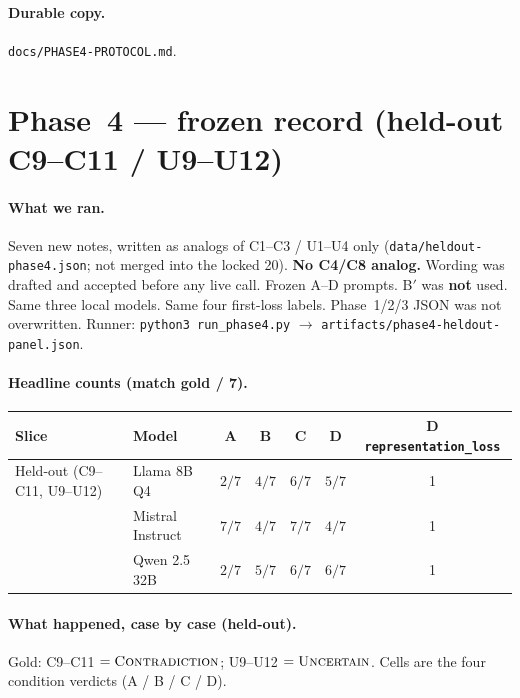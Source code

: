 \documentclass[11pt,a4paper]{article}
\newcommand{\unc}{\textsc{Uncertain}}
\newcommand{\con}{\textsc{Contradiction}}
\begin{document}
\paragraph{Durable copy.}
\texttt{docs/PHASE4-PROTOCOL.md}.

\section{Phase~4 --- frozen record (held-out C9--C11 / U9--U12)}

\paragraph{What we ran.}
Seven new notes, written as analogs of C1--C3 / U1--U4 only (\texttt{data/heldout-phase4.json}; not merged into the locked 20).
\textbf{No C4/C8 analog.}
Wording was drafted and accepted before any live call.
Frozen A--D prompts. B$'$ was \textbf{not} used.
Same three local models. Same four first-loss labels.
Phase~1/2/3 JSON was not overwritten.
Runner: \texttt{python3 run\_phase4.py} $\rightarrow$ \texttt{artifacts/phase4-heldout-panel.json}.

\paragraph{Headline counts (match gold / 7).}
\begin{center}
\small
\begin{tabular}{llccccc}
\toprule
Slice & Model & A & B & C & D & D \texttt{representation\_loss} \\
\midrule
Held-out (C9--C11, U9--U12)
  & Llama 8B Q4 & $2/7$ & $4/7$ & $6/7$ & $5/7$ & 1 \\
  & Mistral Instruct & $7/7$ & $4/7$ & $7/7$ & $4/7$ & 1 \\
  & Qwen 2.5 32B & $2/7$ & $5/7$ & $6/7$ & $6/7$ & 1 \\
\bottomrule
\end{tabular}
\end{center}

\paragraph{What happened, case by case (held-out).}
Gold: C9--C11 $=\con{}$; U9--U12 $=\unc{}$.
Cells are the four condition verdicts (A / B / C / D).
\end{document}

